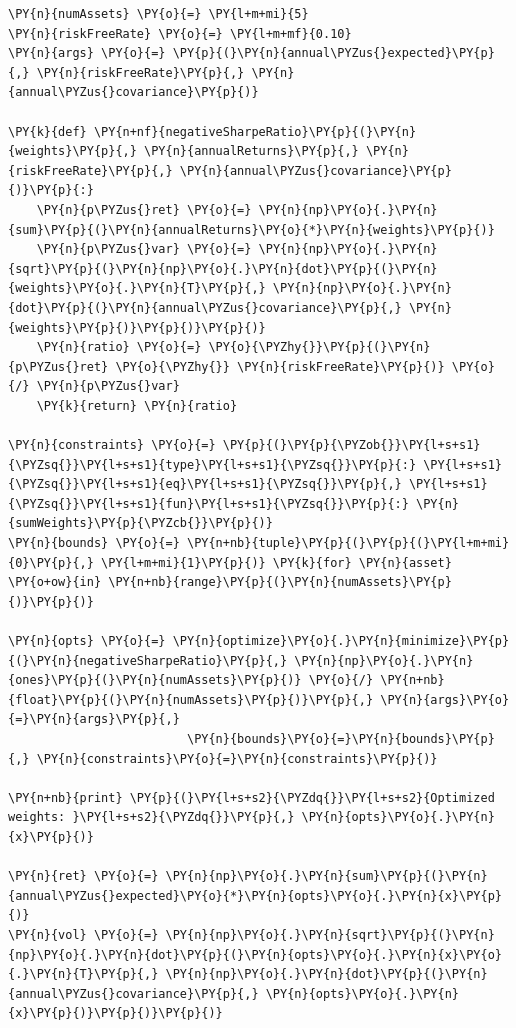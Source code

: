 \begin{tcolorbox}[breakable, size=fbox, boxrule=1pt, pad at break*=1mm,colback=cellbackground, colframe=cellborder]
\begin{Verbatim}[commandchars=\\\{\}]
\PY{n}{numAssets} \PY{o}{=} \PY{l+m+mi}{5}
\PY{n}{riskFreeRate} \PY{o}{=} \PY{l+m+mf}{0.10}
\PY{n}{args} \PY{o}{=} \PY{p}{(}\PY{n}{annual\PYZus{}expected}\PY{p}{,} \PY{n}{riskFreeRate}\PY{p}{,} \PY{n}{annual\PYZus{}covariance}\PY{p}{)}

\PY{k}{def} \PY{n+nf}{negativeSharpeRatio}\PY{p}{(}\PY{n}{weights}\PY{p}{,} \PY{n}{annualReturns}\PY{p}{,} \PY{n}{riskFreeRate}\PY{p}{,} \PY{n}{annual\PYZus{}covariance}\PY{p}{)}\PY{p}{:}
    \PY{n}{p\PYZus{}ret} \PY{o}{=} \PY{n}{np}\PY{o}{.}\PY{n}{sum}\PY{p}{(}\PY{n}{annualReturns}\PY{o}{*}\PY{n}{weights}\PY{p}{)}
    \PY{n}{p\PYZus{}var} \PY{o}{=} \PY{n}{np}\PY{o}{.}\PY{n}{sqrt}\PY{p}{(}\PY{n}{np}\PY{o}{.}\PY{n}{dot}\PY{p}{(}\PY{n}{weights}\PY{o}{.}\PY{n}{T}\PY{p}{,} \PY{n}{np}\PY{o}{.}\PY{n}{dot}\PY{p}{(}\PY{n}{annual\PYZus{}covariance}\PY{p}{,} \PY{n}{weights}\PY{p}{)}\PY{p}{)}\PY{p}{)}
    \PY{n}{ratio} \PY{o}{=} \PY{o}{\PYZhy{}}\PY{p}{(}\PY{n}{p\PYZus{}ret} \PY{o}{\PYZhy{}} \PY{n}{riskFreeRate}\PY{p}{)} \PY{o}{/} \PY{n}{p\PYZus{}var}
    \PY{k}{return} \PY{n}{ratio}
    
\PY{n}{constraints} \PY{o}{=} \PY{p}{(}\PY{p}{\PYZob{}}\PY{l+s+s1}{\PYZsq{}}\PY{l+s+s1}{type}\PY{l+s+s1}{\PYZsq{}}\PY{p}{:} \PY{l+s+s1}{\PYZsq{}}\PY{l+s+s1}{eq}\PY{l+s+s1}{\PYZsq{}}\PY{p}{,} \PY{l+s+s1}{\PYZsq{}}\PY{l+s+s1}{fun}\PY{l+s+s1}{\PYZsq{}}\PY{p}{:} \PY{n}{sumWeights}\PY{p}{\PYZcb{}}\PY{p}{)}
\PY{n}{bounds} \PY{o}{=} \PY{n+nb}{tuple}\PY{p}{(}\PY{p}{(}\PY{l+m+mi}{0}\PY{p}{,} \PY{l+m+mi}{1}\PY{p}{)} \PY{k}{for} \PY{n}{asset} \PY{o+ow}{in} \PY{n+nb}{range}\PY{p}{(}\PY{n}{numAssets}\PY{p}{)}\PY{p}{)}

\PY{n}{opts} \PY{o}{=} \PY{n}{optimize}\PY{o}{.}\PY{n}{minimize}\PY{p}{(}\PY{n}{negativeSharpeRatio}\PY{p}{,} \PY{n}{np}\PY{o}{.}\PY{n}{ones}\PY{p}{(}\PY{n}{numAssets}\PY{p}{)} \PY{o}{/} \PY{n+nb}{float}\PY{p}{(}\PY{n}{numAssets}\PY{p}{)}\PY{p}{,} \PY{n}{args}\PY{o}{=}\PY{n}{args}\PY{p}{,}
                         \PY{n}{bounds}\PY{o}{=}\PY{n}{bounds}\PY{p}{,} \PY{n}{constraints}\PY{o}{=}\PY{n}{constraints}\PY{p}{)}

\PY{n+nb}{print} \PY{p}{(}\PY{l+s+s2}{\PYZdq{}}\PY{l+s+s2}{Optimized weights: }\PY{l+s+s2}{\PYZdq{}}\PY{p}{,} \PY{n}{opts}\PY{o}{.}\PY{n}{x}\PY{p}{)}

\PY{n}{ret} \PY{o}{=} \PY{n}{np}\PY{o}{.}\PY{n}{sum}\PY{p}{(}\PY{n}{annual\PYZus{}expected}\PY{o}{*}\PY{n}{opts}\PY{o}{.}\PY{n}{x}\PY{p}{)}
\PY{n}{vol} \PY{o}{=} \PY{n}{np}\PY{o}{.}\PY{n}{sqrt}\PY{p}{(}\PY{n}{np}\PY{o}{.}\PY{n}{dot}\PY{p}{(}\PY{n}{opts}\PY{o}{.}\PY{n}{x}\PY{o}{.}\PY{n}{T}\PY{p}{,} \PY{n}{np}\PY{o}{.}\PY{n}{dot}\PY{p}{(}\PY{n}{annual\PYZus{}covariance}\PY{p}{,} \PY{n}{opts}\PY{o}{.}\PY{n}{x}\PY{p}{)}\PY{p}{)}\PY{p}{)}


\end{Verbatim}
\end{tcolorbox}

